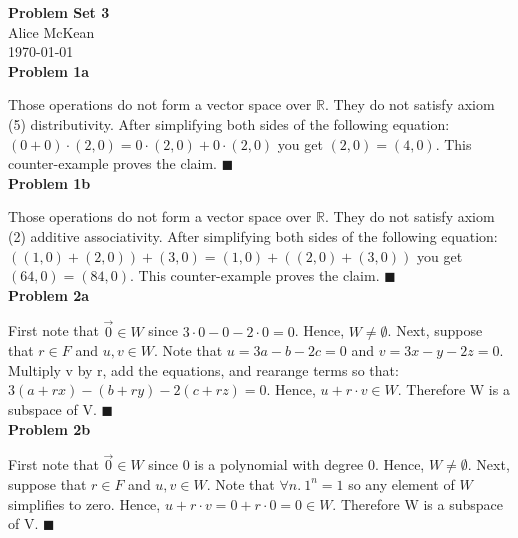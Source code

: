 \documentclass{article}
\newcommand{\problem}[1]{\large\textbf{Problem #1}\normalsize}
\newcommand{\qed}{\hfill\ensuremath{\blacksquare}}
\begin{document}
\noindent\Large\textbf{Problem Set 3} \\
\normalsize
Alice McKean \\
\today \\

\problem{1a}

Those operations do not form a vector space over $\mathbb{R}$. They do not
satisfy axiom (5) distributivity. After simplifying both sides of the following equation: 
$(0 + 0) \cdot (2, 0) = 0 \cdot (2, 0) + 0 \cdot (2, 0)$ you get
$(2, 0) = (4, 0)$. This counter-example proves the claim. \qed \\

\problem{1b}

Those operations do not form a vector space over $\mathbb{R}$. They do not
satisfy axiom (2) additive associativity. After simplifying both sides of
the following equation: $((1, 0) + (2, 0)) + (3, 0) = (1, 0) + ((2, 0) + (3, 0))$
you get $(64, 0) = (84, 0)$. This counter-example proves the claim. \qed \\

\problem{2a}

First note that $\vec{0} \in W$ since $3 \cdot 0 - 0 - 2 \cdot 0 = 0$. Hence, $W \neq \emptyset$. Next,
suppose that $r \in F$ and $u, v \in W$. Note that $u = 3a - b - 2c = 0$ and
$v = 3x - y - 2z = 0$. Multiply v by r, add the equations, and rearange terms so that:
$3(a + rx) - (b + ry) - 2(c + rz) = 0$. Hence, $u + r \cdot v \in W$.
Therefore W is a subspace of V. \qed \\

\problem{2b}

First note that $\vec{0} \in W$ since $0$ is a polynomial with degree $0$. Hence, $W \neq \emptyset$. Next,
suppose that $r \in F$ and $u, v \in W$. Note that $\forall n. \: 1^n = 1$ so any
element of $W$ simplifies to zero. Hence, $u + r \cdot v = 0 + r \cdot 0 = 0 \in W$.
Therefore W is a subspace of V. \qed
\end{document}
